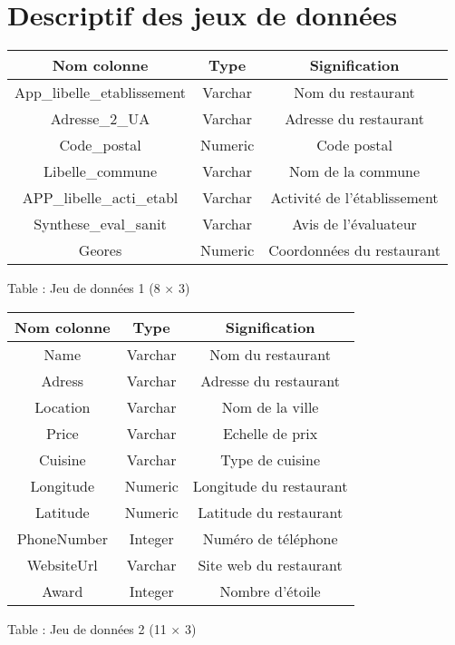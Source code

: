 \documentclass[mstat,12pt]{unswthesis}
\begin{document}
\hypertarget{descriptif-des-jeux-de-donnuxe9es}{%
\section{Descriptif des jeux de
données}\label{descriptif-des-jeux-de-donnuxe9es}}

\begin{longtable}[]{@{}ccc@{}}
\toprule()
Nom colonne & Type & Signification \\
\midrule()
\endhead
App\_libelle\_etablissement & Varchar & Nom du restaurant \\
Adresse\_2\_UA & Varchar & Adresse du restaurant \\
Code\_postal & Numeric & Code postal \\
Libelle\_commune & Varchar & Nom de la commune \\
APP\_libelle\_acti\_etabl & Varchar & Activité de l'établissement \\
Synthese\_eval\_sanit & Varchar & Avis de l'évaluateur \\
Geores & Numeric & Coordonnées du restaurant \\
\bottomrule()
\end{longtable}

Table : Jeu de données 1 (8 \(\times\) 3)

\medskip

\bigskip

\begin{longtable}[]{@{}ccc@{}}
\toprule()
Nom colonne & Type & Signification \\
\midrule()
\endhead
Name & Varchar & Nom du restaurant \\
Adress & Varchar & Adresse du restaurant \\
Location & Varchar & Nom de la ville \\
Price & Varchar & Echelle de prix \\
Cuisine & Varchar & Type de cuisine \\
Longitude & Numeric & Longitude du restaurant \\
Latitude & Numeric & Latitude du restaurant \\
PhoneNumber & Integer & Numéro de téléphone \\
WebsiteUrl & Varchar & Site web du restaurant \\
Award & Integer & Nombre d'étoile \\
\bottomrule()
\end{longtable}

Table : Jeu de données 2 (11 \(\times\) 3)
\end{document}
